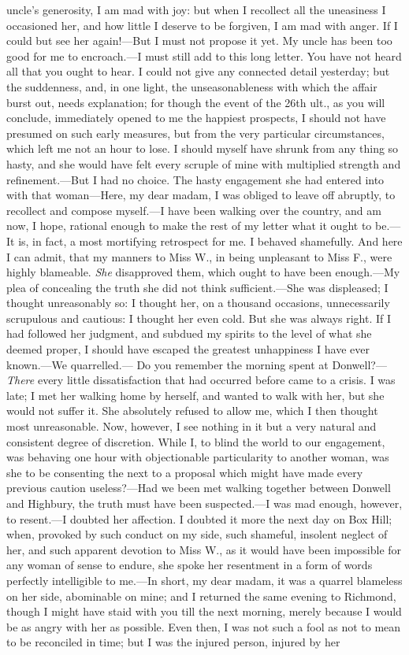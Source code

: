 uncle's generosity, I am mad with joy: but when I recollect all the uneasiness I occasioned her, and how little I deserve to be forgiven, I am mad with anger. If I could but see her again!---But I must not propose it yet. My uncle has been too good for me to encroach.---I must still add to this long letter. You have not heard all that you ought to hear. I could not give any connected detail yesterday; but the suddenness, and, in one light, the unseasonableness with which the affair burst out, needs explanation; for though the event of the 26th ult., as you will conclude, immediately opened to me the happiest prospects, I should not have presumed on such early measures, but from the very particular circumstances, which left me not an hour to lose. I should myself have shrunk from any thing so hasty, and she would have felt every scruple of mine with multiplied strength and refinement.---But I had no choice. The hasty engagement she had entered into with that woman---Here, my dear madam, I was obliged to leave off abruptly, to recollect and compose myself.---I have been walking over the country, and am now, I hope, rational enough to make the rest of my letter what it ought to be.---It is, in fact, a most mortifying retrospect for me. I behaved shamefully. And here I can admit, that my manners to Miss W., in being unpleasant to Miss F., were highly blameable. {\em She} disapproved them, which ought to have been enough.---My plea of concealing the truth she did not think sufficient.---She was displeased; I thought unreasonably so: I thought her, on a thousand occasions, unnecessarily scrupulous and cautious: I thought her even cold. But she was always right. If I had followed her judgment, and subdued my spirits to the level of what she deemed proper, I should have escaped the greatest unhappiness I have ever known.---We quarrelled.--- Do you remember the morning spent at Donwell?---{\em There} every little dissatisfaction that had occurred before came to a crisis. I was late; I met her walking home by herself, and wanted to walk with her, but she would not suffer it. She absolutely refused to allow me, which I then thought most unreasonable. Now, however, I see nothing in it but a very natural and consistent degree of discretion. While I, to blind the world to our engagement, was behaving one hour with objectionable particularity to another woman, was she to be consenting the next to a proposal which might have made every previous caution useless?---Had we been met walking together between Donwell and Highbury, the truth must have been suspected.---I was mad enough, however, to resent.---I doubted her affection. I doubted it more the next day on Box Hill; when, provoked by such conduct on my side, such shameful, insolent neglect of her, and such apparent devotion to Miss W., as it would have been impossible for any woman of sense to endure, she spoke her resentment in a form of words perfectly intelligible to me.---In short, my dear madam, it was a quarrel blameless on her side, abominable on mine; and I returned the same evening to Richmond, though I might have staid with you till the next morning, merely because I would be as angry with her as possible. Even then, I was not such a fool as not to mean to be reconciled in time; but I was the injured person, injured by her 